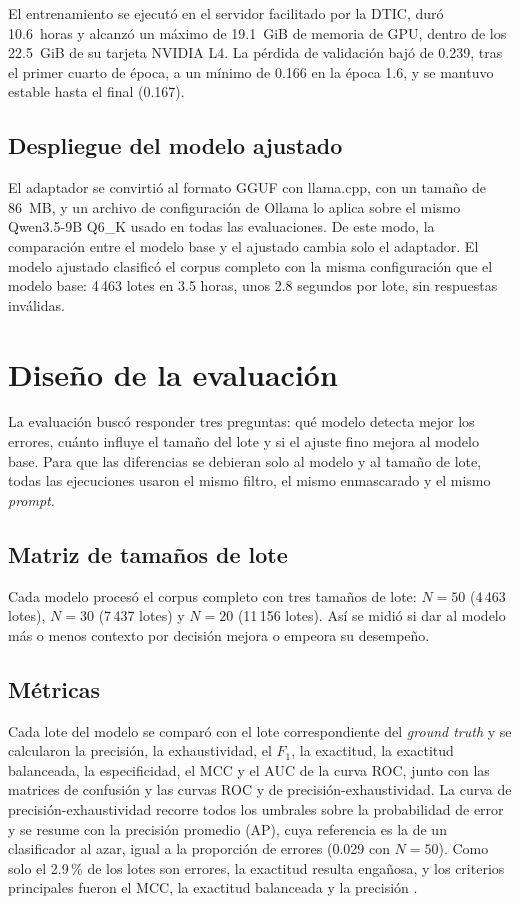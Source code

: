 El entrenamiento se ejecutó en el servidor facilitado por la DTIC, duró 10.6~horas y alcanzó un máximo de 19.1~GiB de memoria de GPU, dentro de los 22.5~GiB de su tarjeta NVIDIA L4.
 La pérdida de validación bajó de 0.239, tras el primer cuarto de época, a un mínimo de 0.166 en la época 1.6, y se mantuvo estable hasta el final (0.167).

\subsection{Despliegue del modelo ajustado}

El adaptador se convirtió al formato GGUF con llama.cpp, con un tamaño de 86~MB, y un archivo de configuración de Ollama lo aplica sobre el mismo Qwen3.5-9B Q6\_K usado en todas las evaluaciones. De este modo, la comparación entre el modelo base y el ajustado cambia solo el adaptador. El modelo ajustado clasificó el corpus completo con la misma configuración que el modelo base: 4\,463 lotes en 3.5 horas, unos 2.8 segundos por lote, sin respuestas inválidas.

\section{Diseño de la evaluación}\label{sec:met_evaluacion}

La evaluación buscó responder tres preguntas: qué modelo detecta mejor los errores, cuánto influye el tamaño del lote y si el ajuste fino mejora al modelo base. Para que las diferencias se debieran solo al modelo y al tamaño de lote, todas las ejecuciones usaron el mismo filtro, el mismo enmascarado y el mismo \textit{prompt}.

\subsection{Matriz de tamaños de lote}

Cada modelo procesó el corpus completo con tres tamaños de lote: $N = 50$ (4\,463 lotes), $N = 30$ (7\,437 lotes) y $N = 20$ (11\,156 lotes). Así se midió si dar al modelo más o menos contexto por decisión mejora o empeora su desempeño.

\subsection{Métricas}\label{subsec:met_metricas}

Cada lote del modelo se comparó con el lote correspondiente del \textit{ground truth} y se calcularon la precisión, la exhaustividad, el $F_1$, la exactitud, la exactitud balanceada, la especificidad, el MCC y el AUC de la curva ROC, junto con las matrices de confusión y las curvas ROC y de precisión-exhaustividad. La curva de precisión-exhaustividad recorre todos los umbrales sobre la probabilidad de error y se resume con la precisión promedio (AP), cuya referencia es la de un clasificador al azar, igual a la proporción de errores (0.029 con $N = 50$). Como solo el 2.9\,\% de los lotes son errores, la exactitud resulta engañosa, y los criterios principales fueron el MCC, la exactitud balanceada y la precisión \cite{chicco2020_mcc}.

